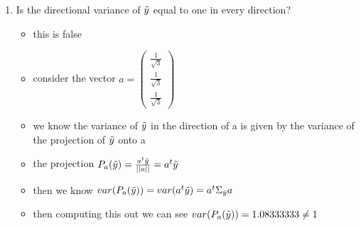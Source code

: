 \documentclass[12pt,twoside]{article}
\begin{document}
\begin{enumerate}
\begin{enumerate}
\item Is the directional variance of $\tilde{  y }$ equal to one in every direction?  
\begin{itemize}
  \color{blue}
  \item this is false 
  \item consider the vector $a=\begin{pmatrix}
    \frac{1}{\sqrt{3}} \\ \frac{1}{\sqrt{3}}  \\ \frac{1}{\sqrt{3}}
  \end{pmatrix}$ 
  \item we know the variance of $\Tilde{y}$ in the direction of a is given by the variance of the projection of $\Tilde{y}$
  onto a 
  \item the projection $P_{a}(\Tilde{y})=\frac{a^t\Tilde{y}}{||a||}=a^{t}\Tilde{y}$
  \item then we know $var(P_{a}(\Tilde{y}))=var(a^t\Tilde{y})=a^{t}\Sigma_{\Tilde{y}}a$
  \item then computing this out we can see $var(P_{a}(\Tilde{y}))= 1.08333333\neq 1$
\end{itemize}



\end{enumerate}
\end{enumerate}
\end{document}
